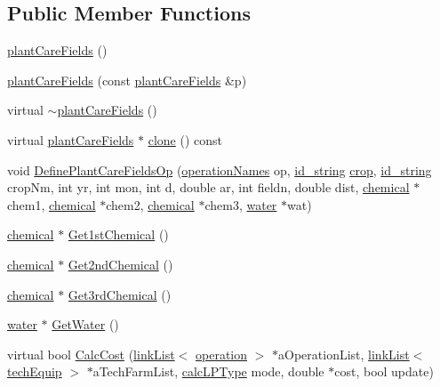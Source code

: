 \subsection*{Public Member Functions}
\begin{DoxyCompactItemize}
\item 
\hyperlink{classplant_care_fields_ac0019b8e6264ef0ddfa4e7470ab78a47}{plantCareFields} ()
\item 
\hyperlink{classplant_care_fields_a1f59456f19d39adae604e13b5bc2e9d0}{plantCareFields} (const \hyperlink{classplant_care_fields}{plantCareFields} \&p)
\item 
virtual \hyperlink{classplant_care_fields_a0b65b66f22596fd0742bb89c891069a1}{$\sim$plantCareFields} ()
\item 
virtual \hyperlink{classplant_care_fields}{plantCareFields} $\ast$ \hyperlink{classplant_care_fields_a9fc0efabe5abf7359f56514c889ca743}{clone} () const 
\item 
void \hyperlink{classplant_care_fields_ad77b3f991a2d5fbc396fc524fb77eb4e}{DefinePlantCareFieldsOp} (\hyperlink{operation_names_8h_a77d40de6faa131199a5de6df3d9c7e3d}{operationNames} op, \hyperlink{classfield_operation_fields_a65517d20c09329343461131d07d48ecb}{id\_\-string} \hyperlink{classcrop}{crop}, \hyperlink{classfield_operation_fields_a65517d20c09329343461131d07d48ecb}{id\_\-string} cropNm, int yr, int mon, int d, double ar, int fieldn, double dist, \hyperlink{classchemical}{chemical} $\ast$chem1, \hyperlink{classchemical}{chemical} $\ast$chem2, \hyperlink{classchemical}{chemical} $\ast$chem3, \hyperlink{classwater}{water} $\ast$wat)
\item 
\hyperlink{classchemical}{chemical} $\ast$ \hyperlink{classplant_care_fields_a03226f11e808ffa15fb3f02b271109e4}{Get1stChemical} ()
\item 
\hyperlink{classchemical}{chemical} $\ast$ \hyperlink{classplant_care_fields_a8f8e515e160373683a252690cc5f5cb2}{Get2ndChemical} ()
\item 
\hyperlink{classchemical}{chemical} $\ast$ \hyperlink{classplant_care_fields_a2b8d91a57e0e212f7384093b53d20413}{Get3rdChemical} ()
\item 
\hyperlink{classwater}{water} $\ast$ \hyperlink{classplant_care_fields_ab9f4b5a42d87b3b47e1ac6772da03888}{GetWater} ()
\item 
virtual bool \hyperlink{classplant_care_fields_a14bb648891c128209ae40889534b4257}{CalcCost} (\hyperlink{classlink_list}{linkList}$<$ \hyperlink{classoperation}{operation} $>$ $\ast$aOperationList, \hyperlink{classlink_list}{linkList}$<$ \hyperlink{classtech_equip}{techEquip} $>$ $\ast$aTechFarmList, \hyperlink{typer_8h_af05cf854fc14086a0d6404be5ae9813f}{calcLPType} mode, double $\ast$cost, bool update)
\end{DoxyCompactItemize}


